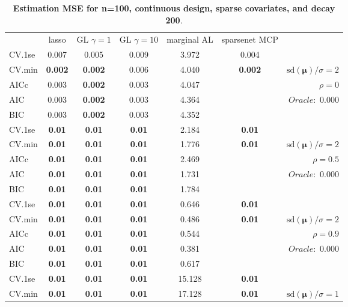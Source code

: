 \clearpage
\begin{table}\vspace{-.5cm}
\caption[l]{ { \bf Estimation MSE for n=100, continuous design, 
sparse covariates, and  decay  200}.}
\vspace{-.5cm}
\footnotesize{}
\begin{center}
\begin{tabular}{l*{5}{c}|r}
& lasso & GL $\gamma=1$ & GL $\gamma=10$ & marginal AL & sparsenet MCP  & \\
 \cline{1-7}
CV.1se & 0.007 & 0.005 & 0.009 & 3.972 & 0.004 & \\
CV.min & {\bf 0.002} & {\bf 0.002} & 0.006 & 4.040 & {\bf 0.002} &  $\mathrm{sd}(\mathbf{\mu})/\sigma=2$ \\
AICc & 0.003 & {\bf 0.002} & 0.003 & 4.047 & & $\rho=0$ \\
AIC & 0.003 & {\bf 0.002} & 0.003 & 4.364 & &  \multirow{2}{*}{$Oracle: $ 0.000} \\
BIC & 0.003 & {\bf 0.002} & 0.003 & 4.352 & &  \\
 \hline 
CV.1se & {\bf 0.01} & {\bf 0.01} & {\bf 0.01} & 2.184 & {\bf 0.01} & \\
CV.min & {\bf 0.01} & {\bf 0.01} & {\bf 0.01} & 1.776 & {\bf 0.01} &  $\mathrm{sd}(\mathbf{\mu})/\sigma=2$ \\
AICc & {\bf 0.01} & {\bf 0.01} & {\bf 0.01} & 2.469 & & $\rho=0.5$ \\
AIC & {\bf 0.01} & {\bf 0.01} & {\bf 0.01} & 1.731 & &  \multirow{2}{*}{$Oracle: $ 0.000} \\
BIC & {\bf 0.01} & {\bf 0.01} & {\bf 0.01} & 1.784 & &  \\
 \hline 
CV.1se & {\bf 0.01} & {\bf 0.01} & {\bf 0.01} & 0.646 & {\bf 0.01} & \\
CV.min & {\bf 0.01} & {\bf 0.01} & {\bf 0.01} & 0.486 & {\bf 0.01} &  $\mathrm{sd}(\mathbf{\mu})/\sigma=2$ \\
AICc & {\bf 0.01} & {\bf 0.01} & {\bf 0.01} & 0.544 & & $\rho=0.9$ \\
AIC & {\bf 0.01} & {\bf 0.01} & {\bf 0.01} & 0.381 & &  \multirow{2}{*}{$Oracle: $ 0.000} \\
BIC & {\bf 0.01} & {\bf 0.01} & {\bf 0.01} & 0.617 & &  \\
 \hline 
CV.1se & {\bf 0.01} & {\bf 0.01} & {\bf 0.01} & 15.128 & {\bf 0.01} & \\
CV.min & {\bf 0.01} & {\bf 0.01} & {\bf 0.01} & 17.128 & {\bf 0.01} &  $\mathrm{sd}(\mathbf{\mu})/\sigma=1$ \\

\end{tabular}
\end{center}
\end{table}
